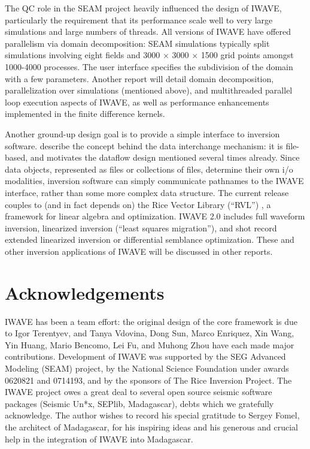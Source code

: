 {The QC role in the SEAM project heavily influenced the design of 
IWAVE, particularly the requirement that its performance scale well to
very large simulations and large numbers of threads. All versions of
IWAVE have offered parallelism via domain decomposition: SEAM
simulations typically split simulations involving eight fields and
3000 $\times$ 3000 $\times$ 1500 grid points amongst 1000-4000
processes. The user interface specifies the subdivision of the domain
with a few parameters. Another report will detail domain
decomposition, parallelization over simulations (mentioned above), and
multithreaded parallel loop execution aspects of IWAVE, as well as
performance enhancements implemented in the finite difference kernels.

Another ground-up design goal is to provide a simple interface to
inversion software. \cite{Geopros:11} describe the concept behind
the data interchange mechanism: it is file-based, and motivates the
dataflow design mentioned several times already. Since data objects,
represented as files or collections of files, determine their own i/o
modalities, inversion software can simply communicate pathnames to the
IWAVE interface, rather than some more complex data structure. The
current release couples to (and in fact depends on)
the Rice Vector Library (``RVL'') \cite[]{RVLTOMS}, a
framework for linear algebra and optimization.
IWAVE 2.0 includes full waveform inversion, linearized inversion
(``least squares migration''), and shot record extended linearized inversion or
differential semblance optimization. These and other inversion
applications of IWAVE will be discussed in other reports.

\section{Acknowledgements}
IWAVE has been a team effort: the original design of the core
framework is due to Igor Terentyev, and Tanya Vdovina, Dong Sun, Marco
Enriquez, Xin Wang, Yin Huang, Mario Bencomo, Lei Fu, and Muhong Zhou
have each made major contributions.
Development of IWAVE was supported by the SEG Advanced Modeling (SEAM)
project, by the National Science Foundation under awards 0620821 and
0714193, and by the sponsors of The Rice Inversion Project. The IWAVE
project owes a great deal to several open source seismic software
packages (Seismic Un*x, SEPlib, Madagascar), debts which we gratefully
acknowledge. The author wishes to record his special gratitude to
Sergey Fomel, the architect of Madagascar, for his inspiring ideas and
his generous and crucial help in the integration of IWAVE into Madagascar.

}
